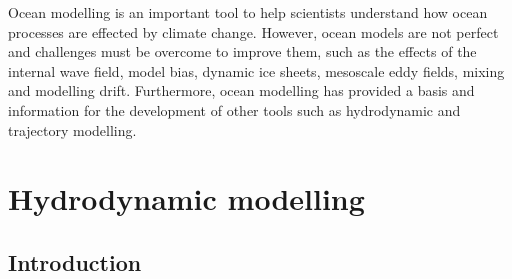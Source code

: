\documentclass[
]{article}
\begin{document}
Ocean modelling is an important tool to help scientists understand how
ocean processes are effected by climate change. However, ocean models
are not perfect and challenges must be overcome to improve them, such as
the effects of the internal wave field, model bias, dynamic ice sheets,
mesoscale eddy fields, mixing and modelling drift. Furthermore, ocean
modelling has provided a basis and information for the development of
other tools such as hydrodynamic and trajectory modelling.

\hypertarget{hydrodynamic-modelling}{%
\section{Hydrodynamic modelling}\label{hydrodynamic-modelling}}

\hypertarget{introduction-1}{%
\subsection{Introduction}\label{introduction-1}}
\end{document}

